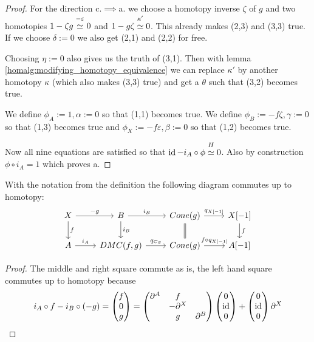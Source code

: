 \documentclass[fontsize=11pt,fleqn,a4paper]{scrartcl}
\begin{document}
\begin{proof}
\medbreak
For the direction c.$\implies$a. we choose a homotopy inverse $\zeta$ of $g$ and two homotopies $1-\zeta g \overset{-\varepsilon}{\overset{}{\simeq}} 0$ and $1-g\zeta \overset{\kappa'}{\overset{}{\simeq}} 0$. This already makes (2,3) and (3,3) true. If we choose $\delta:=0$ we also get (2,1) and (2,2) for free.

Choosing $\eta:=0$ also gives us the truth of (3,1). Then with lemma \ref{homalg:modifying_homotopy_equivalence} we can replace $\kappa'$ by another homotopy $\kappa$ (which also makes (3,3) true) and get a $\theta$ such that (3,2) becomes true.

We define $\phi_A:=1, \alpha:=0$ so that (1,1) becomes true. We define $\phi_B:=-f\zeta, \gamma:=0$ so that (1,3) becomes true and $\phi_X:=-f\varepsilon, \beta:=0$ so that (1,2) becomes true.

Now all nine equations are satisfied so that $\operatorname{id} - i_A\circ\phi \overset{H}{\overset{}{\simeq}} 0$. Also by construction $\phi\circ i_A = 1$ which proves a.
\end{proof}

\begin{lemma}
With the notation from the definition the following diagram commutes up to homotopy:
\[\begin{tikzcd}
X \ar[r,"-g"] \ar[d,"f"] & B \ar[r,"i_B"] \ar[d,"i_B"] & Cone(g) \ar[r,"q_{X[-1]}"] \ar[d,equal] & X[-1] \ar[d,"f"] \\
A \ar[r,"i_A"] & DMC(f,g) \ar[r,"q_{Cg}"] & Cone(g) \ar[r,"f\circ q_{X[-1]}"] & A[-1]
\end{tikzcd}\]
\end{lemma}
\begin{proof}
The middle and right square commute as is, the left hand square commutes up to homotopy because
\[i_A\circ f - i_B\circ (-g) = \begin{pmatrix}f\\0\\g\end{pmatrix} = \begin{pmatrix}
\partial^A & f & \\ & -\partial^X & \\ & g & \partial^B
\end{pmatrix}\begin{pmatrix}0\\\operatorname{id}\\0\end{pmatrix} + \begin{pmatrix}0\\\operatorname{id}\\0\end{pmatrix}\partial^X \qedhere\]
\end{proof}
\end{document}
